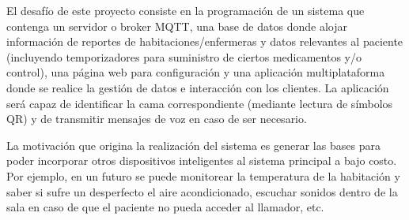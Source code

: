 \documentclass[
11pt, %
]{charter}
\begin{document}
El desafío de este proyecto consiste en la programación de un sistema que contenga un servidor o broker MQTT, una base de datos donde alojar información de reportes de habitaciones/enfermeras y datos relevantes al paciente (incluyendo temporizadores para suministro de ciertos medicamentos y/o control), una página web para configuración y una aplicación multiplataforma donde se realice la gestión de datos e interacción con los clientes. La aplicación será capaz de identificar la cama correspondiente (mediante lectura de símbolos QR) y de transmitir mensajes de voz en caso de ser necesario.

La motivación que origina la realización del sistema es generar las bases para poder incorporar otros dispositivos inteligentes al sistema principal a bajo costo. Por ejemplo, en un futuro se puede monitorear la temperatura de la habitación y saber si sufre un desperfecto el aire acondicionado, escuchar sonidos dentro de la sala en caso de que el paciente no pueda acceder al llamador, etc.




%
\end{document}
